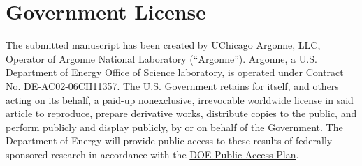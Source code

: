 \pagebreak
\section*{Government License}

The submitted manuscript has been created by UChicago Argonne, LLC, 
Operator of Argonne National Laboratory (“Argonne”). Argonne, a U.S. 
Department of Energy Office of Science laboratory, is operated under 
Contract No. DE-AC02-06CH11357. The U.S. Government retains for itself, and others acting on its behalf, a paid-up nonexclusive, irrevocable 
worldwide license in said article to reproduce, prepare derivative 
works, distribute copies to the public, and perform publicly and display 
publicly, by or on behalf of the Government. The Department of Energy 
will provide public access to these results of federally sponsored 
research in accordance with the \href{http://energy.gov/downloads/doe-public-access-plan}{DOE Public Access Plan}.
